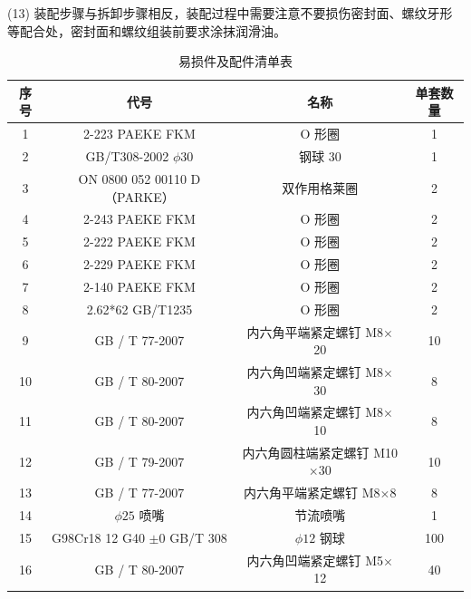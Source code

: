 (13) 装配步骤与拆卸步骤相反，装配过程中需要注意不要损伤密封面、螺纹牙形等配合处，密封面和螺纹组装前要求涂抹润滑油。

\begin{table}[htbp]
    \centering
    \caption{易损件及配件清单表}
    \label{tab:parts_list}
    \renewcommand{\arraystretch}{1.5} %
    \begin{tabular}{cccc}
        \toprule
        \textbf{序号} & \textbf{代号} & \textbf{名称} & \textbf{单套数量} \\
        \midrule
        1  & 2-223 PAEKE FKM                      & O 形圈                 & 1   \\
        2  & GB/T308-2002 $\phi 30$               & 钢球 30                & 1   \\
        3  & ON 0800 052 00110 D （PARKE）        & 双作用格莱圈           & 2   \\
        4  & 2-243 PAEKE FKM                      & O 形圈                 & 2   \\
        5  & 2-222 PAEKE FKM                      & O 形圈                 & 2   \\
        6  & 2-229 PAEKE FKM                      & O 形圈                 & 2   \\
        7  & 2-140 PAEKE FKM                      & O 形圈                 & 2   \\
        8  & 2.62*62 GB/T1235                     & O 形圈                 & 2   \\
        9  & GB / T 77-2007                       & 内六角平端紧定螺钉 M8$\times$20  & 10  \\
        10 & GB / T 80-2007                       & 内六角凹端紧定螺钉 M8$\times$30  & 8   \\
        11 & GB / T 80-2007                       & 内六角凹端紧定螺钉 M8$\times$10  & 8   \\
        12 & GB / T 79-2007                       & 内六角圆柱端紧定螺钉 M10$\times$30 & 10  \\
        13 & GB / T 77-2007                       & 内六角平端紧定螺钉 M8$\times$8   & 8   \\
        14 & $\phi 25$ 喷嘴                       & 节流喷嘴               & 1   \\
        15 & G98Cr18 12 G40 $\pm 0$ GB/T 308      & $\phi 12$ 钢球         & 100 \\
        16 & GB / T 80-2007                       & 内六角凹端紧定螺钉 M5$\times$12  & 40  \\

\end{tabular}
\end{table}
